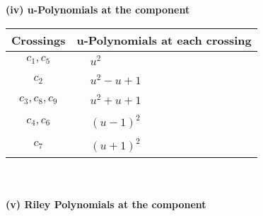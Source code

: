 \documentclass[1p]{elsarticle_modified}
\theoremstyle{definition}
\begin{document}
\newpage\renewcommand{\arraystretch}{1}
\flushleft \textbf{(iv) u-Polynomials at the component}\newline \\
\begin{tabular}{m{50pt}|m{274pt}}
Crossings & \hspace{64pt}u-Polynomials at each crossing \\
\hline $$\begin{aligned}c_{1},c_{5}\end{aligned}$$&$\begin{aligned}
&u^2
\end{aligned}$\\
\hline $$\begin{aligned}c_{2}\end{aligned}$$&$\begin{aligned}
&u^2- u+1
\end{aligned}$\\
\hline $$\begin{aligned}c_{3},c_{8},c_{9}\end{aligned}$$&$\begin{aligned}
&u^2+u+1
\end{aligned}$\\
\hline $$\begin{aligned}c_{4},c_{6}\end{aligned}$$&$\begin{aligned}
&(u-1)^2
\end{aligned}$\\
\hline $$\begin{aligned}c_{7}\end{aligned}$$&$\begin{aligned}
&(u+1)^2
\end{aligned}$\\
\hline
\end{tabular}\\~\\
\newpage\renewcommand{\arraystretch}{1}
\flushleft \textbf{(v) Riley Polynomials at the component}\newline \\
\end{document}
